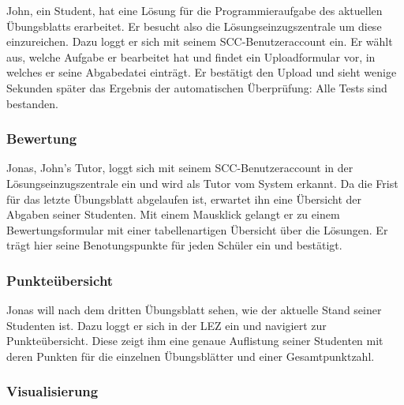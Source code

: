 \documentclass[a4paper,10pt]{article}
\begin{document}
John, ein Student, hat eine Lösung für die Programmieraufgabe des aktuellen Übungsblatts erarbeitet. Er besucht also die Lösungseinzugszentrale um diese einzureichen. Dazu loggt er sich mit seinem SCC-Benutzeraccount ein. Er wählt aus, welche Aufgabe er bearbeitet hat und findet ein Uploadformular vor, in welches er seine Abgabedatei einträgt. Er bestätigt den Upload und sieht wenige Sekunden später das Ergebnis der automatischen Überprüfung: Alle Tests sind bestanden.

\subsubsection{Bewertung}

Jonas, John's Tutor, loggt sich mit seinem SCC-Benutzeraccount in der Lösungseinzugszentrale ein und wird als Tutor vom System erkannt.  Da die Frist für das letzte Übungsblatt abgelaufen ist, erwartet ihn eine Übersicht der Abgaben seiner Studenten. Mit einem Mausklick gelangt er zu einem Bewertungsformular mit einer tabellenartigen Übersicht über die Lösungen.  Er trägt hier seine Benotungspunkte für jeden Schüler ein und bestätigt.

\subsubsection{Punkteübersicht}

Jonas will nach dem dritten Übungsblatt sehen, wie der aktuelle Stand seiner Studenten ist.  Dazu loggt er sich in der LEZ ein und navigiert zur Punkteübersicht. Diese zeigt ihm eine genaue Auflistung seiner Studenten mit deren Punkten für die einzelnen Übungsblätter und einer Gesamtpunktzahl.

\subsubsection{Visualisierung}

\clearpage

\end{document}
